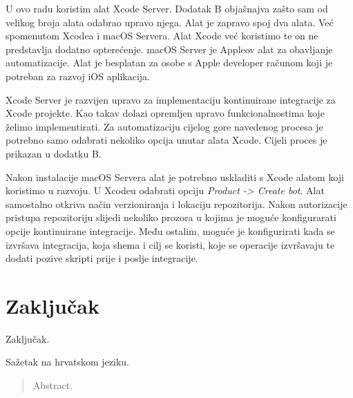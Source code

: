 \documentclass[times, utf8, diplomski, numeric]{fer}
\begin{document}
U ovo radu koristim alat Xcode Server. Dodatak B objašnajva zašto sam od velikog broja alata odabrao upravo njega. Alat je zapravo spoj dva alata. Već spomenutom Xcodea i macOS Servera. Alat Xcode već koristimo te on ne predstavlja dodatno opterećenje. macOS Server je Appleov alat za obavljanje automatizacije. Alat je besplatan za osobe s Apple developer računom koji je potreban za razvoj iOS aplikacija.

Xcode Server je razvijen upravo za implementaciju kontinuirane integracije za Xcode projekte. Kao takav dolazi opremljen upravo funkcionalnostima koje želimo implementirati. Za automatizaciju cijelog gore navedenog procesa je potrebno samo odabrati nekoliko opcija unutar alata Xcode. Cijeli proces je prikazan u dodatku B.

Nakon instalacije macOS Servera alat je potrebno uskladiti s Xcode alatom koji koristimo u razvoju. U Xcodeu odabrati opciju \textit{Product -> Create bot}. Alat samostalno otkriva način verzioniranja i lokaciju repozitorija. Nakon autorizacije pristupa repozitoriju slijedi nekoliko prozora u kojima je moguće konfigurarati opcije kontinuirane integracije. Među ostalim, moguće je konfigurirati kada se izvršava integracija, koja shema i cilj se koristi, koje se operacije izvršavaju te dodati pozive skripti prije i poslje integracije.









\chapter{Zaključak}
Zaključak.




\begin{sazetak}
Sažetak na hrvatskom jeziku.

\end{sazetak}

\begin{abstract}
Abstract.

\end{abstract}
\end{document}
